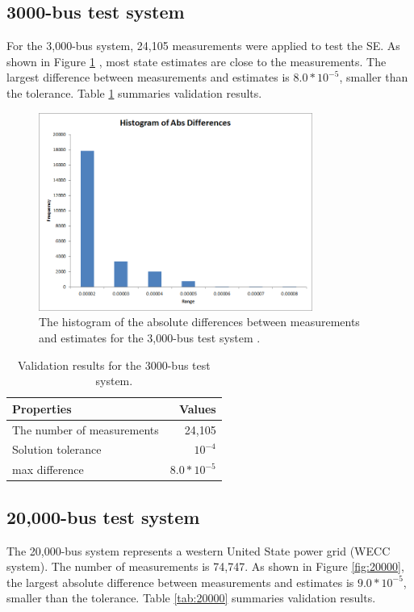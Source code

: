 \documentclass[a4paper]{article}
\begin{document}
\newpage
\subsection{3000-bus test system}
\label{sec:3000}

For the 3,000-bus system, 24,105 measurements were applied to test the SE. As shown in Figure \ref{fig:3000} , most state estimates are close to the measurements. The largest difference between measurements and estimates is $8.0*10^{-5}$, smaller than the tolerance.  Table \ref{tab:3000} summaries validation results.

\begin{figure}[ht]
\centering
\includegraphics[width=0.8\textwidth]{3000.png}
\caption{The histogram of the absolute differences between measurements and estimates for the 3,000-bus test system .}
\label{fig:3000}
\end{figure}

\begin{table} [h]
\centering
\begin{tabular}{l|r}
Properties & Values \\\hline
The number of measurements & 24,105\\
Solution tolerance	& $10^{-4}$ \\
max difference	&  $8.0*10^{-5}$ 
\end{tabular}
\caption{\label{tab:3000} Validation results for the 3000-bus test system.}
\end{table}

\subsection{20,000-bus test system}
\label{sec:20000}

The 20,000-bus system represents a western United State power grid (WECC system). The number of measurements is 74,747. As shown in Figure \ref{fig:20000}, the largest absolute difference between measurements and estimates is $9.0*10^{-5}$, smaller than the tolerance. Table \ref{tab:20000} summaries validation results.
\end{document}
